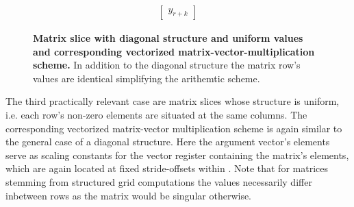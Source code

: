 \documentclass{article}
\begin{document}
\begin{figure}[ht]
$$\begin{matrix}
\begin{bmatrix}
                                                                                                                 y_{r+k}
                                                                                                                \end{bmatrix}
        \end{matrix}
        $$
        \caption[Matrix slice with diagonal structure and uniform values and corresponding vectorized matrix-vector-multiplication scheme.]{\textbf{Matrix slice with diagonal structure and uniform values and corresponding vectorized matrix-vector-multiplication scheme.} In addition to the diagonal structure the matrix row's values are identical simplifying the arithemtic scheme.}
        \label{fig:simd_scheme_diag_collated}
      \end{figure}

      The third practically relevant case are matrix slices whose structure is uniform, i.e. each row's non-zero elements are situated at the same columns. The corresponding vectorized matrix-vector multiplication scheme is again similar to the general case of a diagonal structure. Here the argument vector's elements serve as scaling constants for the vector register containing the matrix's elements, which are again located at fixed stride-offsets within \V. Note that for matrices stemming from structured grid computations the values necessarily differ inbetween rows as the matrix would be singular otherwise.
\end{document}
